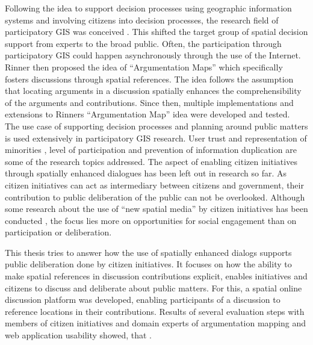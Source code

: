 Following the idea to support decision processes using geographic information systems and involving citizens into decision processes, the research field of participatory GIS was conceived \cite{Macintosh2004_eParticipation_characterization,Sieber2006_PublicParticipationGIS}. This shifted the target group of spatial decision support from experts to the broad public. Often, the participation through participatory GIS could happen asynchronously through the use of the Internet. Rinner then proposed the idea of ``Argumentation Maps'' \cite{Rinner_ArgumentationMaps} which specifically fosters discussions through spatial references. The idea follows the assumption that locating arguments in a discussion spatially enhances the comprehensibility of the arguments and contributions. Since then, multiple implementations and extensions to Rinners ``Argumentation Map'' idea were developed and tested.\\
The use case of supporting decision processes and planning around public matters is used extensively in participatory GIS research. User trust and representation of minorities \cite{Carver2001_PPGIS_Cyberdemocracy}, level of participation \cite{Steinmann2005_Combination_Ladder_GIS} and prevention of information duplication \cite{Hopfer2007_Communication} are some of the research topics addressed. The aspect of enabling citizen initiatives through spatially enhanced dialogues has been left out in research so far. As citizen initiatives can act as intermediary between citizens and government, their contribution to public deliberation of the public can not be overlooked. Although some research about the use of ``new spatial media'' by citizen initiatives has been conducted \cite{Elwood2013_NewSpatialMedia}, the focus lies more on opportunities for social engagement than on participation or deliberation.

This thesis tries to answer how the use of spatially enhanced dialogs supports public deliberation done by citizen initiatives. It focuses on how the ability to make spatial references in discussion contributions explicit, enables initiatives and citizens to discuss and deliberate about public matters. For this, a spatial online discussion platform was developed, enabling participants of a discussion to reference locations in their contributions. Results of several evaluation steps with members of citizen initiatives and domain experts of argumentation mapping and web application usability showed, that  .



